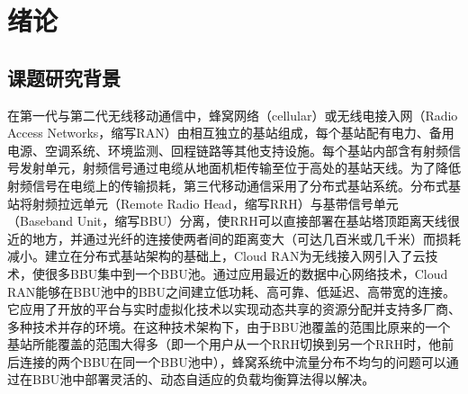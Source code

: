 
\chapter{绪论}
\label{chap:Intro}
\section{课题研究背景}
在第一代与第二代无线移动通信中，蜂窝网络（cellular）或无线电接入网（Radio Access Networks，缩写RAN）由相互独立的基站组成，每个基站配有电力、备用电源、空调系统、环境监测、回程链路等其他支持设施。每个基站内部含有射频信号发射单元，射频信号通过电缆从地面机柜传输至位于高处的基站天线。为了降低射频信号在电缆上的传输损耗，第三代移动通信采用了分布式基站系统。分布式基站将射频拉远单元（Remote Radio Head，缩写RRH）与基带信号单元（Baseband Unit，缩写BBU）分离，使RRH可以直接部署在基站塔顶距离天线很近的地方，并通过光纤的连接使两者间的距离变大（可达几百米或几千米）而损耗减小。建立在分布式基站架构的基础上，Cloud RAN为无线接入网引入了云技术，使很多BBU集中到一个BBU池。通过应用最近的数据中心网络技术，Cloud RAN能够在BBU池中的BBU之间建立低功耗、高可靠、低延迟、高带宽的连接。它应用了开放的平台与实时虚拟化技术以实现动态共享的资源分配并支持多厂商、多种技术并存的环境。在这种技术架构下，由于BBU池覆盖的范围比原来的一个基站所能覆盖的范围大得多（即一个用户从一个RRH切换到另一个RRH时，他前后连接的两个BBU在同一个BBU池中）\cite{ran2015optimal}，蜂窝系统中流量分布不均匀的问题可以通过在BBU池中部署灵活的、动态自适应的负载均衡算法得以解决。


